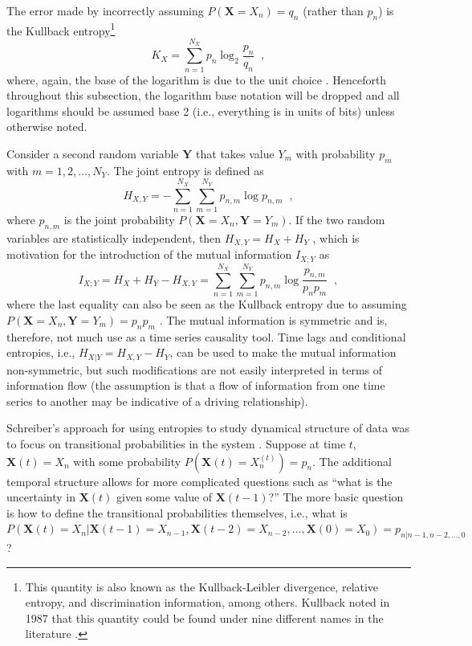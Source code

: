 The error made by incorrectly assuming $P(\mathbf{X}=X_n) = q_n$ (rather than $p_n$) is the Kullback entropy\footnote{This quantity is also known as the Kullback-Leibler divergence, relative entropy, and discrimination information, among others.  Kullback noted in 1987 that this quantity could be found under nine different names in the literature \cite{Kullback1987}.}
\begin{equation}
K_X =  \sum_{n=1}^{N_X} p_n \log_2 \frac{p_n}{q_n}\;\;,
\end{equation}
where, again, the base of the logarithm is due to the unit choice \cite{Kullback1951,Schreiber2000,Schindler2007,Kaiser2002}.  Henceforth throughout this subsection, the logarithm base notation will be dropped and all logarithms should be assumed base 2 (i.e., everything is in units of bits) unless otherwise noted.

Consider a second random variable $\mathbf{Y}$ that takes value $Y_m$ with probability $p_m$ with $m = 1,2,\ldots,N_Y$.  The joint entropy is defined as
\begin{equation}
H_{X,Y} = -\sum_{n=1}^{N_X} \sum_{m=1}^{N_Y} p_{n,m} \log p_{n,m}\;\;,
\end{equation}
where $p_{n,m}$ is the joint probability $P(\mathbf{X}=X_n,\mathbf{Y}=Y_m)$.  If the two random variables are statistically independent, then $H_{X,Y} = H_X+H_Y$ \cite{Schindler2007}, which is motivation for the introduction of the mutual information $I_{X;Y}$ as
\begin{equation}
I_{X;Y} = H_X + H_Y - H_{X,Y} = \sum_{n=1}^{N_X} \sum_{m=1}^{N_Y} p_{n,m} \log \frac{p_{n,m}}{p_n p_m}\;\;,
\end{equation}
where the last equality can also be seen as the Kullback entropy due to assuming $P(\mathbf{X}=X_n,\mathbf{Y}=Y_m)=p_n p_m$ \cite{Kaiser2002}.  The mutual information is symmetric and is, therefore, not much use as a time series causality tool.  Time lags and conditional entropies, i.e., $H_{X|Y} = H_{X,Y} - H_{Y}$, can be used to make the mutual information non-symmetric, but such modifications are not easily interpreted in terms of information flow \cite{Schreiber2000} (the assumption is that a flow of information from one time series to another may be indicative of a driving relationship).  

Schreiber's approach for using entropies to study dynamical structure of data was to focus on transitional probabilities in the system \cite{Schreiber2000}.  Suppose at time $t$, $\mathbf{X}(t) = X_n$ with some probability $P(\mathbf{X}(t) = X_n^{(t)})=p_n$.  The additional temporal structure allows for more complicated questions such as ``what is the uncertainty in $\mathbf{X}(t)$ given some value of $\mathbf{X}(t-1)$?''  The more basic question is how to define the transitional probabilities themselves, i.e., what is $P(\mathbf{X}(t) = X_n | \mathbf{X}(t-1) = X_{n-1},\mathbf{X}(t-2) = X_{n-2},\ldots,\mathbf{X}(0) = X_{0}) = p_{n|n-1,n-2,\ldots,0}$?

